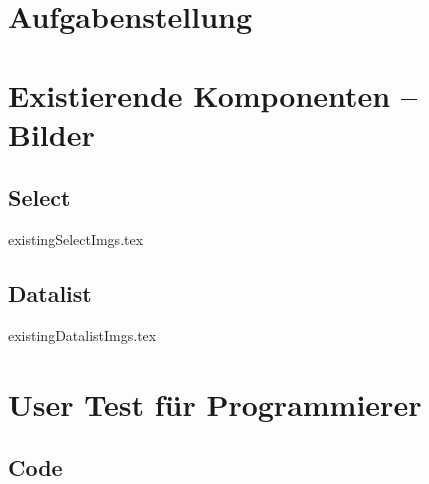 \chapter{Aufgabenstellung}
\label{chap:task}




\chapter{Existierende Komponenten – Bilder}
\label{chap:existingImgs}

\section*{Select}
\graphicspath{ {./img/select/} }
{existingSelectImgs.tex}
\graphicspath{ {./img/} }

\clearpage
\section*{Datalist}
\graphicspath{ {./img/datalist/} }
{existingDatalistImgs.tex}
\graphicspath{ {./img/} }


\chapter{User Test für Programmierer}
\label{chap:userTestProgrammers}

\section*{Code}

